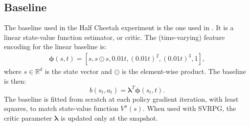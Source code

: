 \documentclass{article}
\theoremstyle{remark}
\theoremstyle{definition}
\newcommand{\Reward}{\mathcal{R}}
\newcommand{\vphi}{\boldsymbol{\phi}}
\begin{document}
\subsection{Baseline}
The baseline used in the Half Cheetah experiment is the one used in \cite{duan2016benchmarking}. It is a linear state-value function estimator, or critic. 
The (time-varying) feature encoding for the linear baseline is:
\begin{align*}
\vphi(s,t)=[s, s \odot s, 0.01t, (0.01t)^2, (0.01t)^3,1],
\end{align*}
where $s\in\mathbb{R}^d$ is the state vector and $\odot$ is the element-wise product. The baseline is then:
\[
b(s_t,a_t) = \mathbf{\lambda}^T\vphi(s_t,t).
\]
The baseline is fitted from scratch at each policy gradient iteration, with least squares, to match state-value function $V^{\pi}(s)$.
When used with SVRPG, the critic parameter $\mathbf{\lambda}$ is updated only at the snapshot.

\end{document}
